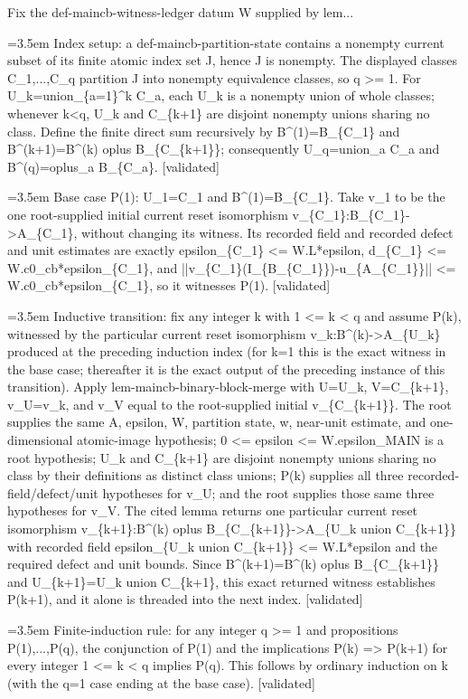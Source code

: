 \documentclass{article}
\newcommand{\step}[1]{\par\noindent\hangindent=3.5em\hangafter=1%
  \makebox[3.5em][l]{\textbf{#1.}}}
\newcommand{\steptag}[1]{\hfill{\small\textsf{[#1]}}}
\begin{document}
\begin{proofbox}{Fix the def-maincb-witness-ledger datum W supplied by lem...}
\step{1.2.1} Index setup: a def-maincb-partition-state contains a nonempty current subset of its finite atomic index set J, hence J is nonempty. The displayed classes C\_1,...,C\_q partition J into nonempty equivalence classes, so q >= 1. For U\_k=union\_\{a=1\}\textasciicircum{}k C\_a, each U\_k is a nonempty union of whole classes; whenever k<q, U\_k and C\_\{k+1\} are disjoint nonempty unions sharing no class. Define the finite direct sum recursively by B\textasciicircum{}(1)=B\_\{C\_1\} and B\textasciicircum{}(k+1)=B\textasciicircum{}(k) oplus B\_\{C\_\{k+1\}\}; consequently U\_q=union\_a C\_a and B\textasciicircum{}(q)=oplus\_a B\_\{C\_a\}. \steptag{validated} \\[4pt]
\step{1.2.2} Base case P(1): U\_1=C\_1 and B\textasciicircum{}(1)=B\_\{C\_1\}. Take v\_1 to be the one root-supplied initial current reset isomorphism v\_\{C\_1\}:B\_\{C\_1\}->A\_\{C\_1\}, without changing its witness. Its recorded field and recorded defect and unit estimates are exactly epsilon\_\{C\_1\} <= W.L*epsilon, d\_\{C\_1\} <= W.c0\_cb*epsilon\_\{C\_1\}, and ||v\_\{C\_1\}(I\_\{B\_\{C\_1\}\})-u\_\{A\_\{C\_1\}\}|| <= W.c0\_cb*epsilon\_\{C\_1\}, so it witnesses P(1). \steptag{validated} \\[4pt]
\step{1.2.3} Inductive transition: fix any integer k with 1 <= k < q and assume P(k), witnessed by the particular current reset isomorphism v\_k:B\textasciicircum{}(k)->A\_\{U\_k\} produced at the preceding induction index (for k=1 this is the exact witness in the base case; thereafter it is the exact output of the preceding instance of this transition). Apply lem-maincb-binary-block-merge with U=U\_k, V=C\_\{k+1\}, v\_U=v\_k, and v\_V equal to the root-supplied initial v\_\{C\_\{k+1\}\}. The root supplies the same A, epsilon, W, partition state, w, near-unit estimate, and one-dimensional atomic-image hypothesis; 0 <= epsilon <= W.epsilon\_MAIN is a root hypothesis; U\_k and C\_\{k+1\} are disjoint nonempty unions sharing no class by their definitions as distinct class unions; P(k) supplies all three recorded-field/defect/unit hypotheses for v\_U; and the root supplies those same three hypotheses for v\_V. The cited lemma returns one particular current reset isomorphism v\_\{k+1\}:B\textasciicircum{}(k) oplus B\_\{C\_\{k+1\}\}->A\_\{U\_k union C\_\{k+1\}\} with recorded field epsilon\_\{U\_k union C\_\{k+1\}\} <= W.L*epsilon and the required defect and unit bounds. Since B\textasciicircum{}(k+1)=B\textasciicircum{}(k) oplus B\_\{C\_\{k+1\}\} and U\_\{k+1\}=U\_k union C\_\{k+1\}, this exact returned witness establishes P(k+1), and it alone is threaded into the next index. \steptag{validated} \\[4pt]
\step{1.2.4} Finite-induction rule: for any integer q >= 1 and propositions P(1),...,P(q), the conjunction of P(1) and the implications P(k) => P(k+1) for every integer 1 <= k < q implies P(q). This follows by ordinary induction on k (with the q=1 case ending at the base case). \steptag{validated} \\[4pt]
\end{proofbox}
\end{document}
